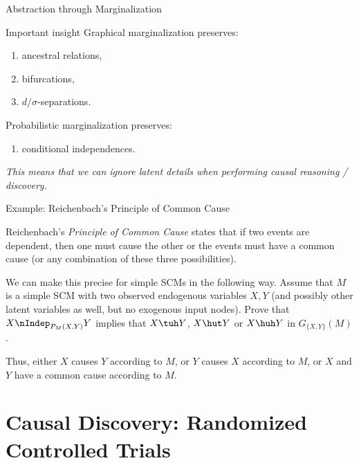 \begin{frame}{Abstraction through Marginalization}
  \begin{block}{Important insight}
  Graphical marginalization preserves:
    \begin{enumerate}
      \item ancestral relations, 
      \item bifurcations, 
      \item $d/\sigma$-separations.
    \end{enumerate}
  Probabilistic marginalization preserves:
    \begin{enumerate}
      \item conditional independences.
    \end{enumerate}
    \emph{This means that we can ignore latent details when performing causal reasoning / discovery.}
  \end{block}
\end{frame}

\begin{frame}{Example: Reichenbach's Principle of Common Cause}
\begin{Exc}
  Reichenbach's \emph{Principle of Common Cause} states that if two events are dependent,
  then one must cause the other or the events must have a common cause (or any combination of these three possibilities).

  \bigskip
  We can make this precise for simple SCMs in the following way. Assume that $M$
  is a simple SCM with two observed endogenous variables $X,Y$ (and possibly other
  latent variables as well, but no exogenous input nodes). Prove that 
  $X \nIndep_{P_{M}(X,Y)} Y$
  implies that $X \tuh Y$,
  $X \hut Y$ or $X \huh Y$ in $G_{\{X,Y\}}(M)$.

  \bigskip
  Thus, either $X$ causes $Y$ according to $M$, 
  or $Y$ causes $X$ according to $M$,
  or $X$ and $Y$ have a common cause according to $M$.
\end{Exc}
\end{frame}


\part{Causal Discovery: Randomized Controlled Trials}
\frame{\partpage}

